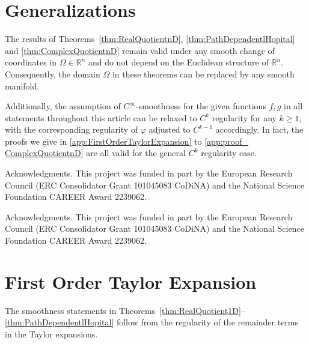 \documentclass{article}
\newcommand{\Albert}[1]{{\color[rgb]{0.2,0.4,0.8}\textbf{Albert: } #1}}
\theoremstyle{theorem}
\theoremstyle{definition}
\def\RR{\mathbb{R}}
\begin{document}
\section{Generalizations}
\label{sec:Generalizations}
The results of Theorems~\ref{thm:RealQuotientnD}, \ref{thm:PathDependentlHopital} and \ref{thm:ComplexQuotientnD} remain valid under any smooth change of coordinates in \(\Omega\in\RR^n\) and do not depend on the Euclidean structure of \(\RR^n\).  Consequently, the domain \(\Omega\) in these theorems can be replaced by any smooth manifold.

Additionally, the assumption of \(C^\infty\)-smoothness for the given functions \(f,g\) in all statements throughout this article can be relaxed to \(C^k\) regularity for any \(k\geq 1\), with the corresponding regularity of \(\varphi\) adjusted to \(C^{k-1}\) accordingly. In fact, the proofs we give in \autoref{app:FirstOrderTaylorExpansion} to \ref{app:proof_ ComplexQuotientnD} are all valid for the general  \(C^k\) regularity case.

\ifdefined\AMM
\begin{acknowledgment}{Acknowledgments.}
This project was funded in part by the European Research Council (ERC Consolidator
Grant 101045083 CoDiNA) and the National Science Foundation CAREER Award 2239062.
\end{acknowledgment}
\else
\begin{acknowledgment}{Acknowledgments.}
This project was funded in part by the European Research Council (ERC Consolidator
Grant 101045083 CoDiNA) and the National Science Foundation CAREER Award 2239062.
\end{acknowledgment}
\fi



\appendix

\section{First Order Taylor Expansion}
\label{app:FirstOrderTaylorExpansion}
The smoothness statements in Theorems~\ref{thm:RealQuotient1D}--\ref{thm:PathDependentlHopital} follow from the regularity of the remainder terms in the Taylor expansions.
\end{document}
